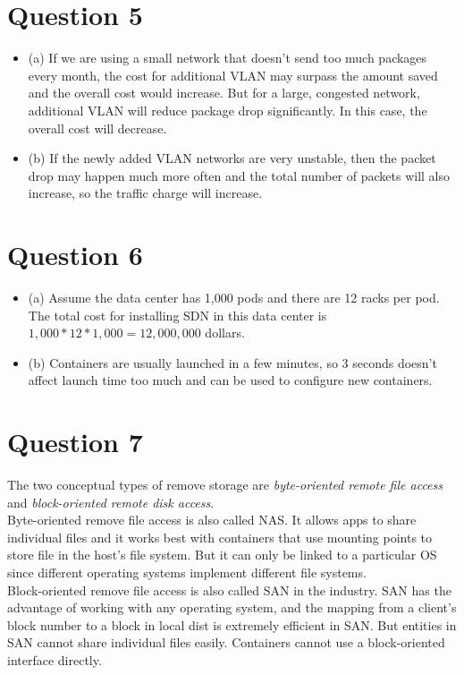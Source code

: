 \documentclass{article}
\begin{document}
\section{Question 5}
\begin{itemize}
    \item (a) If we are using a small network that doesn't send too much packages every month, the cost for additional VLAN may surpass the amount saved and the overall cost would increase. But for a large, congested network, additional VLAN will reduce package drop significantly. In this case, the overall cost will decrease.
    \item (b) If the newly added VLAN networks are very unstable, then the packet drop may happen much more often and the total number of packets will also increase, so the traffic charge will increase.
\end{itemize}

\section{Question 6}
\begin{itemize}
    \item (a) Assume the data center has 1,000 pods and there are 12 racks per pod. The total cost for installing SDN in this data center is $1,000 * 12 * 1,000 = 12,000,000$ dollars.
    \item (b) Containers are usually launched in a few minutes, so 3 seconds doesn't affect launch time too much and can be used to configure new containers.
\end{itemize}

\section{Question 7}
The two conceptual types of remove storage are \textit{byte-oriented remote file access} and \textit{block-oriented remote disk access}. \\
Byte-oriented remove file access is also called NAS. It allows apps to share individual files and it works best with containers that use mounting points to store file in the host's file system. But it can only be linked to a particular OS since different operating systems implement different file systems. \\
Block-oriented remove file access is also called SAN in the industry. SAN has the advantage of working with any operating system, and the mapping from a client's block number to a block in local dist is extremely efficient in SAN. But entities in SAN cannot share individual files easily. Containers cannot use a block-oriented interface directly. 
\end{document}
